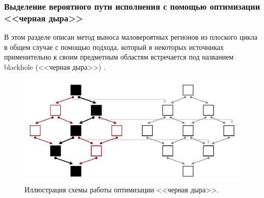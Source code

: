 \subsubsection{Выделение вероятного пути исполнения с помощью оптимизации <<черная дыра>>}

В этом разделе описан метод выноса маловероятных регионов из плоского цикла в общем случае с помощью подхода, который в некоторых источниках применительно к своим предметным областям встречается под названием blackhole (<<черная дыра>>) \cite{Ilbeyi2019}.

\begin{figure}[ht]
\centering
\includegraphics[width=1.0\textwidth]{./pics/text_4_vec_loc_branch/blackhole.pdf}
\caption{Иллюстрация схемы работы оптимизации <<черная дыра>>.}
\label{fig:text_4_vec_loc_branch_blackhole}
\end{figure}


